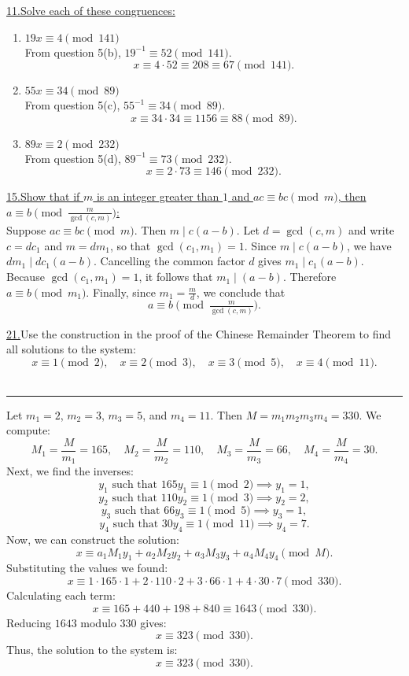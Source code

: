 \documentclass[12pt]{article}
\begin{document}
\newpage
\noindent\underline{11.\;Solve each of these congruences:}
\begin{enumerate}[label=(\alph*)]
    \item $19x \equiv 4 \pmod{141}$\\
From question 5(b), $19^{-1} \equiv 52 \pmod{141}$.
    \[
    x \equiv 4 \cdot 52 \equiv 208 \equiv 67 \pmod{141}.
    \]
    \item $55x \equiv 34 \pmod{89}$\\
From question 5(c), $55^{-1} \equiv 34 \pmod{89}$.
    \[
    x \equiv 34 \cdot 34 \equiv 1156 \equiv 88 \pmod{89}.
    \]
    \item $89x \equiv 2 \pmod{232}$\\
From question 5(d), $89^{-1} \equiv 73 \pmod{232}$.
    \[
    x \equiv 2 \cdot 73 \equiv 146 \pmod{232}.
    \]
\end{enumerate}

\vspace{5mm}
\noindent\underline{15.\;Show that if $m$ is an integer greater than $1$ and $ac \equiv bc \pmod{m}$, then $a \equiv b \pmod{\frac{m}{\gcd(c,m)}}$:}
\\\indent Suppose $ac \equiv bc \pmod{m}$. Then $m \mid c(a-b)$. 
Let $d=\gcd(c,m)$ and write $c = d c_1$ and $m = d m_1$, so that $\gcd(c_1,m_1)=1$. Since $m \mid c(a-b)$, we have $d m_1 \mid d c_1 (a-b)$. Cancelling the common factor $d$ gives $m_1 \mid c_1 (a-b)$. Because $\gcd(c_1,m_1)=1$, it follows that $m_1 \mid (a-b)$. Therefore $a \equiv b \pmod{m_1}$. Finally, since $m_1 = \tfrac{m}{d}$, we conclude that
\[
a \equiv b \pmod{\tfrac{m}{\gcd(c,m)}}.
\]

\vspace{5mm}
\noindent\underline{21.}Use the construction in the proof of the Chinese Remainder Theorem to find all solutions to the system:
\[
 x \equiv 1 \pmod{2},\quad
 x \equiv 2 \pmod{3},\quad
 x \equiv 3 \pmod{5},\quad
 x \equiv 4 \pmod{11}.
\]
\\ \rule{\linewidth}{0.5pt}
Let $m_1=2$, $m_2=3$, $m_3=5$, and $m_4=11$. Then $M=m_1 m_2 m_3 m_4 = 330$. We compute:
\[ M_1 = \frac{M}{m_1} = 165, \quad M_2 = \frac{M}{m_2} = 110, \quad M_3 = \frac{M}{m_3} = 66, \quad M_4 = \frac{M}{m_4} = 30. \]
Next, we find the inverses:
\[ y_1 \text{ such that } 165y_1 \equiv 1 \pmod{2} \implies y_1 = 1, \]
\[ y_2 \text{ such that } 110y_2 \equiv 1 \pmod{3} \implies y_2 = 2, \]
\[ y_3 \text{ such that } 66y_3 \equiv 1 \pmod{5} \implies y_3 = 1, \]
\[ y_4 \text{ such that } 30y_4 \equiv 1 \pmod{11} \implies y_4 = 7. \]
Now, we can construct the solution:
\[
x \equiv a_1 M_1 y_1 + a_2 M_2 y_2 + a_3 M_3 y_3 + a_4 M_4 y_4 \pmod{M}.
\]
Substituting the values we found:
\[
x \equiv 1 \cdot 165 \cdot 1 + 2 \cdot 110 \cdot 2 + 3 \cdot 66 \cdot 1 + 4 \cdot 30 \cdot 7 \pmod{330}.
\]
Calculating each term:
\[
x \equiv 165 + 440 + 198 + 840 \equiv 1643 \pmod{330}.
\]
Reducing $1643$ modulo $330$ gives:
\[
x \equiv 323 \pmod{330}.
\]
Thus, the solution to the system is:
\[
x \equiv 323 \pmod{330}.
\]
\end{document}
